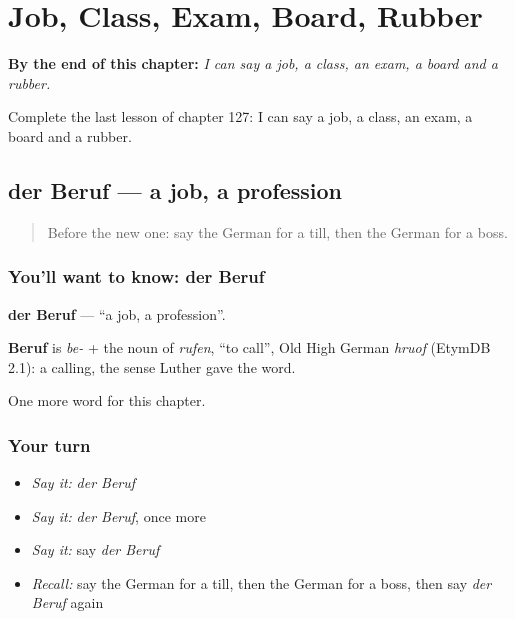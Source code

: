 
\chapter{Job, Class, Exam, Board, Rubber}
\label{ch:ge-job-class-exam-board-rubber}

\begin{chapteropening}
\textbf{By the end of this chapter:} \emph{I can say a job, a class, an exam, a board and a rubber.}

Complete the last lesson of chapter 127: I can say a job, a class, an exam, a board and a rubber.
\end{chapteropening}

\section[der Beruf]{der Beruf — a job, a profession}

\label{lesson:GE-C127-beruf}



\begin{quote}
Before the new one: say the German for a till, then the German for a boss.
\end{quote}

\subsection*{You'll want to know: der Beruf}
\textbf{der Beruf} — \textquotedblleft{}a job, a profession\textquotedblright{}.

\begin{cousinweb}
\textbf{Beruf} is \emph{be-} + the noun of \emph{rufen}, \textquotedblleft{}to call\textquotedblright{}, Old High German \emph{hruof} (EtymDB 2.1): a calling, the sense Luther gave the word.
\end{cousinweb}

\begin{grammarlens}[title={What you've built}]
One more word for this chapter.
\end{grammarlens}

\subsection*{Your turn}
\begin{itemize}
\raggedright
  \item \emph{Say it:} \emph{der Beruf}
  \item \emph{Say it:} \emph{der Beruf}, once more
  \item \emph{Say it:} say \emph{der Beruf}
  \item \emph{Recall:} say the German for a till, then the German for a boss, then say \emph{der Beruf} again
\end{itemize}

